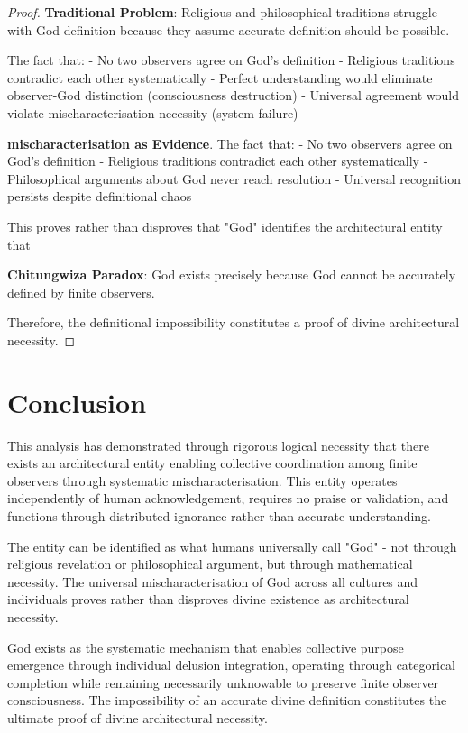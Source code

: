 \documentclass[12pt,a4paper]{article}
\begin{document}
\begin{proof}
\textbf{Traditional Problem}: Religious and philosophical traditions struggle with God definition because they assume accurate definition should be possible.

 The fact that: 
- No two observers agree on God's definition - Religious traditions contradict each other systematically 
- Perfect understanding would eliminate observer-God distinction (consciousness destruction)
- Universal agreement would violate mischaracterisation necessity (system failure)

\textbf{mischaracterisation as Evidence}. The fact that:
- No two observers agree on God's definition
- Religious traditions contradict each other systematically
- Philosophical arguments about God never reach resolution
- Universal recognition persists despite definitional chaos

This proves rather than disproves that "God" identifies the architectural entity that

\textbf{Chitungwiza Paradox}: God exists precisely because God cannot be accurately defined by finite observers.

Therefore, the definitional impossibility constitutes a proof of divine architectural necessity.
\end{proof}

\section*{Conclusion}

This analysis has demonstrated through rigorous logical necessity that there exists an architectural entity enabling collective coordination among finite observers through systematic mischaracterisation. This entity operates independently of human acknowledgement, requires no praise or validation, and functions through distributed ignorance rather than accurate understanding.

The entity can be identified as what humans universally call "God" - not through religious revelation or philosophical argument, but through mathematical necessity. The universal mischaracterisation of God across all cultures and individuals proves rather than disproves divine existence as architectural necessity.

God exists as the systematic mechanism that enables collective purpose emergence through individual delusion integration, operating through categorical completion while remaining necessarily unknowable to preserve finite observer consciousness. The impossibility of an accurate divine definition constitutes the ultimate proof of divine architectural necessity.
\end{document}
